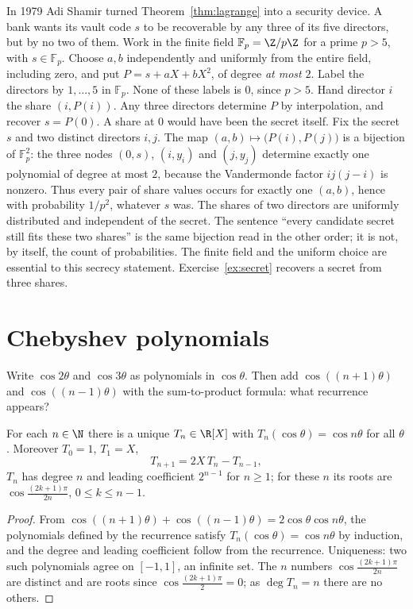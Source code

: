 \begin{examplex}
In 1979 Adi Shamir turned Theorem~\ref{thm:lagrange} into a security device. A bank wants its vault code $s$ to be recoverable by any three of its
five directors, but by no two of them. Work in the finite field $\mathbb F_p=\Z/p\Z$ for a prime $p>5$, with $s\in\mathbb F_p$.
Choose $a,b$ independently and uniformly from the entire field, including zero, and put $P=s+aX+bX^2$, of degree \emph{at most} $2$.
Label the directors by $1,\ldots,5$ in $\mathbb F_p$. None of these labels is $0$, since $p>5$. Hand director $i$ the share $(i,P(i))$. Any three directors determine $P$ by interpolation, and recover $s=P(0)$. A share at $0$ would have been the secret itself.
Fix the secret $s$ and two distinct directors $i,j$. The map $(a,b)\mapsto\bigl(P(i),P(j)\bigr)$ is a bijection of $\mathbb F_p^2$: the three nodes $(0,s)$, $(i,y_i)$ and $(j,y_j)$ determine exactly one polynomial of degree at most $2$, because the Vandermonde factor $ij(j-i)$ is nonzero. Thus every pair of share values occurs for exactly one $(a,b)$, hence with probability $1/p^2$, whatever $s$ was. The shares of two directors are uniformly distributed and independent of the secret. The sentence ``every candidate secret still fits these two shares'' is the same bijection read in the other order; it is not, by itself, the count of probabilities.
The finite field and the uniform choice are essential to this secrecy statement. Exercise~\ref{ex:secret} recovers a secret from three shares.
\end{examplex}

\section{Chebyshev polynomials}

\begin{think}
Write $\cos2\theta$ and $\cos3\theta$ as polynomials in $\cos\theta$. Then add $\cos((n+1)\theta)$ and $\cos((n-1)\theta)$ with the sum-to-product formula: what recurrence appears?
\end{think}

\begin{proposition}\label{prop:cheb}
For each $n\in\N$ there is a unique $T_n\in\R[X]$ with $T_n(\cos\theta)=\cos n\theta$ for all $\theta$. Moreover $T_0=1$, $T_1=X$,
\[
T_{n+1}=2X\,T_n-T_{n-1},
\]
$T_n$ has degree $n$ and leading coefficient $2^{n-1}$ for $n\ge1$; for these $n$ its roots are $\cos\frac{(2k+1)\pi}{2n}$, $0\le k\le n-1$.
\end{proposition}
\begin{proof}
From $\cos((n+1)\theta)+\cos((n-1)\theta)=2\cos\theta\cos n\theta$, the polynomials defined by the recurrence satisfy
$T_n(\cos\theta)=\cos n\theta$ by induction, and the degree and leading coefficient follow from the recurrence. Uniqueness: two such polynomials agree on $[-1,1]$, an infinite set.
The $n$ numbers $\cos\frac{(2k+1)\pi}{2n}$ are distinct and are roots since $\cos\frac{(2k+1)\pi}2=0$; as $\deg T_n=n$ there are no others.
\end{proof}

